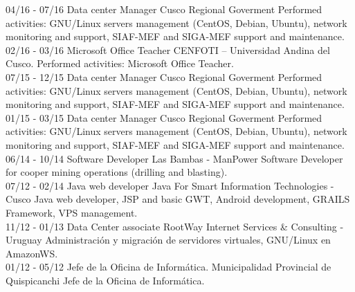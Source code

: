 \documentclass[]{friggeri-cv}
\begin{document}
\begin{entrylist}
    \entry
    {04/16 - 07/16}
    {Data center Manager}
    {Cusco Regional Goverment}
    {Performed activities: GNU/Linux servers management (CentOS, Debian, Ubuntu), network monitoring and support, SIAF-MEF 
	and SIGA-MEF support and maintenance.\\}
    \entry
    {02/16 - 03/16}
    {Microsoft Office Teacher}
    {CENFOTI – Universidad Andina del Cusco.}
    {Performed activities: Microsoft Office Teacher.\\}
    \entry
    {07/15 - 12/15}
    {Data center Manager}
    {Cusco Regional Goverment}
    {Performed activities: GNU/Linux servers management (CentOS, Debian, Ubuntu), network monitoring and support, SIAF-MEF 
	and SIGA-MEF support and maintenance.\\}
    \entry
    {01/15 - 03/15}
    {Data center Manager}
    {Cusco Regional Goverment}
    {Performed activities: GNU/Linux servers management (CentOS, Debian, Ubuntu), network monitoring and support, SIAF-MEF 
	and SIGA-MEF support and maintenance.\\}
    \entry
    {06/14 - 10/14}
    {Software Developer}
    {Las Bambas - ManPower}
	{Software Developer for cooper mining operations (drilling and blasting).\\}
    \entry
    {07/12 - 02/14}
    {Java web developer}
    {Java For Smart Information Technologies - Cusco}
    {Java web developer, JSP and basic GWT, Android development, GRAILS Framework, VPS management.\\}
    \entry
    {11/12 - 01/13}
    {Data Center associate}
    {{RootWay Internet Services \& Consulting - Uruguay}}
    {{Administraci\'on y migraci\'on de servidores virtuales, GNU/Linux en AmazonWS. \\ }}
    \entry
    {01/12 - 05/12}
    {Jefe de la Oficina de Inform\'atica.}
    {Municipalidad Provincial de Quispicanchi}
    {Jefe de la Oficina de Inform\'atica.\\}
\end{entrylist}
\end{document}
